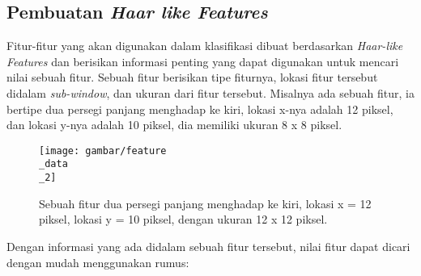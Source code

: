 

\subsection{Pembuatan \textit{Haar like Features}}

Fitur-fitur yang akan digunakan dalam klasifikasi dibuat 
berdasarkan \emph{Haar-like Features} dan berisikan informasi penting yang dapat digunakan 
untuk mencari nilai sebuah fitur. Sebuah fitur berisikan tipe fiturnya, lokasi fitur tersebut 
didalam \textit{sub-window}, dan ukuran dari fitur tersebut.
Misalnya ada sebuah fitur, ia bertipe dua persegi panjang menghadap ke kiri, lokasi x-nya adalah 12 piksel, 
dan lokasi y-nya adalah 10 piksel, dia memiliki ukuran 8 x 8 piksel.

\begin{figure}[H]
  \centering{}
	\texttt{[image: gambar/feature\\\_data\\\_2]}
  \caption{Sebuah fitur dua persegi panjang menghadap ke kiri, lokasi x = 12 piksel, 
  lokasi y = 10 piksel, dengan ukuran 12 x 12 piksel.}
\end{figure} 
Dengan informasi yang ada didalam sebuah fitur tersebut, nilai fitur dapat dicari dengan 
mudah menggunakan rumus:

